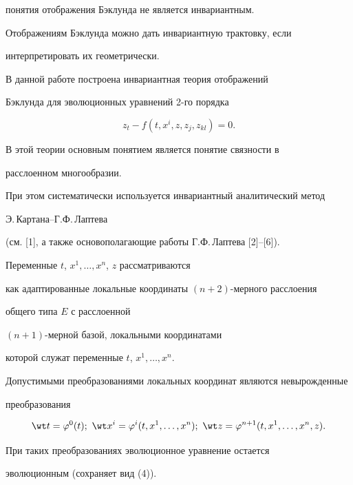 понятия отображения Бэклунда не является инвариантным.





Отображениям Бэклунда можно дать инвариантную трактовку, если 


интерпретировать их геометрически.


В данной работе построена инвариантная теория отображений 


Бэклунда для эволюционных уравнений 2-го порядка


\begin{equation}


z_t-f ({t,x^i,z,z_j,z_{kl}})=0.


\end{equation}


В этой теории основным понятием является понятие связности в 


расслоенном многообразии.


При этом систематически используется инвариантный аналитический метод 


Э.\,Картана--Г.Ф.\,Лаптева


(см. [1], а также основополагающие работы Г.Ф.\,Лаптева [2]--[6]). 


Переменные $t$, $x^1, \dotsc,x^n$, $z$ рассматриваются


как адаптированные локальные координаты $(n+2)$-мерного расслоения 


общего типа $E$ с расслоенной


$({n+1})$-мерной базой, локальными координатами 


которой служат переменные $t$, $x^1, \dotsc,x^n$.


Допустимыми преобразованиями локальных координат являются невырожденные 


преобразования


\begin{equation}


\wt t=\varphi^0 (t);~\wt x^i=


\varphi^i ({t,x^1, \dotsc,x^n});~\wt z=


\varphi^{n+1} ({t,x^1, \dotsc,x^n,z}).


\end{equation}


При таких преобразованиях эволюционное уравнение остается 


эволюционным (сохраняет вид (4)).





